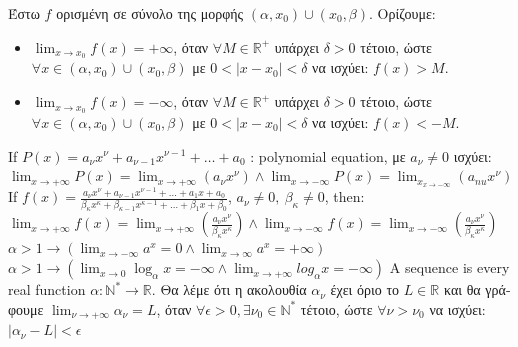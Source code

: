 \documentclass[12pt]{article}
\begin{document}
\begin{flushleft}
	\textgreek{Έστω} $f$ \textgreek{ορισμένη σε σύνολο της μορφής} $\displaystyle (\alpha,x_0) \cup (x_0, \beta)$. \textgreek{Ορίζουμε}:  
	\begin{itemize}
		\renewcommand{\labelitemi}{$\rightarrow$}
		\item $\displaystyle \lim_{x\to x_0} f(x) = +\infty$, \textgreek{όταν} $\forall M \in \mathbb{R}^+$ \textgreek{υπάρχει} $\delta > 0$ \textgreek{τέτοιο, ώστε} $\displaystyle  \forall x \in (\alpha,x_0) \cup (x_0, \beta)$ \textgreek{με} $0<|x-x_0| < \delta $ \textgreek{να ισχύει}: $f(x) > M$. 
		\item $\displaystyle \lim_{x\to x_0} f(x) = -\infty$, \textgreek{όταν} $\forall M \in \mathbb{R}^+$ \textgreek{υπάρχει} $\delta > 0$ \textgreek{τέτοιο, ώστε} $\displaystyle  \forall x \in (\alpha,x_0) \cup (x_0, \beta)$ \textgreek{με} $0<|x-x_0| < \delta $ \textgreek{να ισχύει}: $f(x) < -M$. 
	\end{itemize}
	\textbullet \quad If $\displaystyle P(x) = a_{\nu}x^{\nu} + a_{\nu-1} x^{\nu -1} + \ldots + a_0 $  :  polynomial equation, \textgreek{με} $a_{\nu} \neq 0$ \textgreek{ισχύει}: $\displaystyle \lim_{x\to +\infty} P(x) = \lim_{x\to + \infty} (a_{\nu} x^{\nu}) \land \lim_{x\to -\infty} P(x) = \lim_{x_{x\to -\infty}} (a_{nu} x^{\nu}) $ \linebreak 
	\textbullet \quad If $\displaystyle f(x) = \frac{a_{\nu}x^{\nu} + a_{\nu -1}x^{\nu -1} +\ldots + a_1x + a_0}{\beta_{\kappa}x^{\kappa} + \beta_{\kappa -1}x^{\kappa-1} + \ldots + \beta_1 x + \beta_0} $, $a_{\nu} \neq 0, \ \beta_{\kappa} \neq 0$, then: $\displaystyle \lim_{x\to +\infty} f(x) = \lim_{x\to +\infty} \left(\frac{a_{\nu}x^{\nu}}{\beta_{\kappa}x^{\kappa}}\right) \land \lim_{x\to -\infty} f(x) = \lim_{x\to -\infty} \left(\frac{a_{\nu}x^{\nu}}{\beta_{\kappa}x^{\kappa}}\right)$ \linebreak 
	\textbullet \quad $\displaystyle \alpha > 1 \rightarrow \left( \lim_{x\to -\infty} a^x = 0 \land \lim_{x\to \infty} a^x = + \infty \right) $ \linebreak 
	\textbullet \quad $\displaystyle \alpha > 1 \rightarrow \left( \lim_{x\to 0} \log_{\alpha} x = -\infty \land \lim_{x\to +\infty} log_{\alpha} x = -\infty \right) $ \linebreak 
	\textbullet \quad A sequence is every real function $\displaystyle \alpha: \mathbb{N}^* \rightarrow \mathbb{R}$. \textgreek{Θα λέμε ότι η ακολουθία} $\alpha_{\nu}$ \textgreek{έχει όριο το} $L\in \mathbb{R}$ \textgreek{και θα γράφουμε} $\displaystyle \lim_{\nu \to +\infty} \alpha_{\nu} = L$, \textgreek{όταν} $\displaystyle \forall \epsilon > 0, \exists \nu_0 \in \mathbb{N}^*$ \textgreek{τέτοιο, ώστε} $\displaystyle \forall \nu > \nu_0$ \textgreek{να  ισχύει}: $| \alpha_{\nu} - L | < \epsilon$ \linebreak 
	

\end{flushleft}
\end{document}
